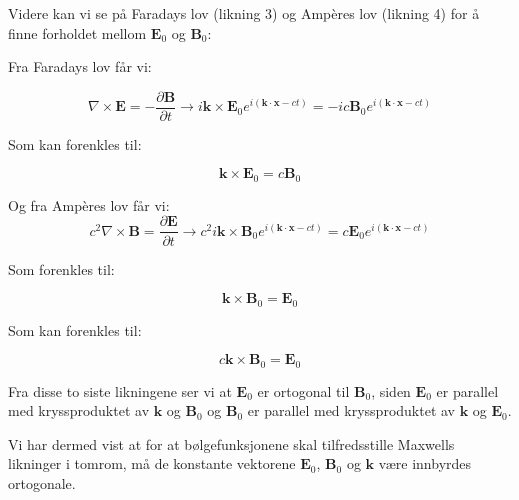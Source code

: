 Videre kan vi se på Faradays lov (likning 3) og Ampères lov (likning 4) for å finne forholdet mellom $\mathbf{E}_0$ og $\mathbf{B}_0$:

Fra Faradays lov får vi:

\begin{equation*}
\nabla \times \mathbf{E} = -\frac{\partial \mathbf{B}}{\partial t} \rightarrow i \mathbf{k} \times \mathbf{E}_0 e^{i(\mathbf{k} \cdot \mathbf{x}-ct)} = -i c \mathbf{B}_0 e^{i(\mathbf{k} \cdot \mathbf{x}-ct)}
\end{equation*}

Som kan forenkles til:

\begin{equation*}
\mathbf{k} \times \mathbf{E}_0 = c \mathbf{B}_0
\end{equation*}

Og fra Ampères lov får vi:
\begin{equation*}
    c^2 \nabla \times \mathbf{B} = \frac{\partial \mathbf{E}}{\partial t} \rightarrow c^2 i \mathbf{k} \times \mathbf{B}_0 e^{i(\mathbf{k} \cdot \mathbf{x}-ct)} = c \mathbf{E}_0 e^{i(\mathbf{k} \cdot \mathbf{x}-ct)}
    \end{equation*}
    
    Som forenkles til:
    
    \begin{equation*}
    \mathbf{k} \times \mathbf{B}_0 = \mathbf{E}_0
    \end{equation*}
    
    

Som kan forenkles til:

\begin{equation*}
c \mathbf{k} \times \mathbf{B}_0 = \mathbf{E}_0
\end{equation*}

Fra disse to siste likningene ser vi at $\mathbf{E}_0$ er ortogonal til $\mathbf{B}_0$, siden $\mathbf{E}_0$ er parallel med kryssproduktet av $\mathbf{k}$ og $\mathbf{B}_0$ og $\mathbf{B}_0$ er parallel med kryssproduktet av $\mathbf{k}$ og $\mathbf{E}_0$.

Vi har dermed vist at for at bølgefunksjonene skal tilfredsstille Maxwells likninger i tomrom, må de konstante vektorene $\mathbf{E}_0$, $\mathbf{B}_0$ og $\mathbf{k}$ være innbyrdes ortogonale.
